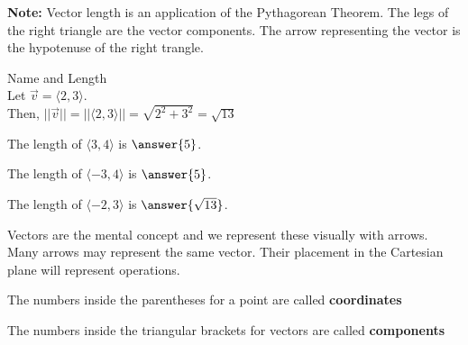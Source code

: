 \documentclass{ximera}
\begin{document}
\textbf{Note:} Vector length is an application of the Pythagorean Theorem.  The legs of the right triangle are the vector components.  The arrow representing the vector is the hypotenuse of the right trangle.


\begin{example} Name and Length \\

Let $\vec{v} = \langle 2, 3 \rangle$. \\

Then, $|| \vec{v} || = || \langle 2, 3 \rangle || = \sqrt{2^2 + 3^2} = \sqrt{13}$

\end{example}







\begin{question} 


The length of  $\langle 3, 4 \rangle$ is $\answer{5}$.



\end{question}






\begin{question} 


The length of  $\langle -3, 4 \rangle$ is $\answer{5}$.



\end{question}



\begin{question} 


The length of  $\langle -2, 3 \rangle$ is $\answer{\sqrt{13}}$.



\end{question}




Vectors are the mental concept and we represent these visually with arrows. Many arrows may represent the same vector.  Their placement in the Cartesian plane will represent operations.


The numbers inside the parentheses for a point are called \textbf{\textcolor{purple!85!blue}{coordinates}}  

The numbers inside the triangular brackets for vectors are called \textbf{\textcolor{purple!85!blue}{components}}  
\end{document}
